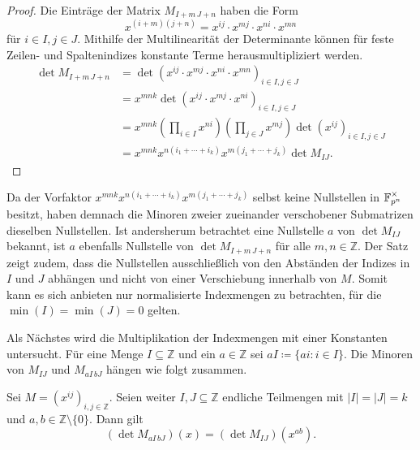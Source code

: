 \begin{proof}
    Die Einträge der Matrix $M_{I+m\,J+n}$ haben die Form 
    \begin{equation*}
        x^{(i+m)(j+n)} = x^{ij} \cdot x^{mj} \cdot x^{ni} \cdot x^{mn} 
    \end{equation*} für $i\in I, j\in J$. Mithilfe der Multilinearität der Determinante können für feste Zeilen- und Spaltenindizes konstante Terme herausmultipliziert werden.
    \begin{align*}
        \det M_{I+m\,J+n}    &= \det \left(x^{ij} \cdot x^{mj} \cdot x^{ni} \cdot x^{mn} \right)_{i\in I,j\in J} \\ 
                            &= x^{mnk} \det \left(x^{ij} \cdot x^{mj} \cdot x^{ni} \right)_{i\in I,j\in J} \\ 
                            &= x^{mnk} \left( \prod_{i \in I} x^{ni} \right) \left( \prod_{j \in J} x^{mj}\right)  \det \left(x^{ij}\right)_{i\in I,j\in J} \\
                            &= x^{mnk} x^{n(i_1 +\cdots +i_k)} x^{m(j_1+\cdots +j_k)}\det M_{IJ}.
    \end{align*}
\end{proof}

Da der Vorfaktor $x^{mnk} x^{n(i_1 +\cdots +i_k)} x^{m(j_1+\cdots +j_k)}$ selbst keine Nullstellen in $\field{p}[n]^\times$ besitzt, haben demnach die Minoren zweier zueinander verschobener Submatrizen dieselben Nullstellen. Ist andersherum betrachtet eine Nullstelle $a$ von $\det M_{IJ}$ bekannt, ist $a$ ebenfalls Nullstelle von $\det M_{I+m\,J+n}$ für alle $m,n \in \mathbb{Z}$. Der Satz zeigt zudem, dass die Nullstellen ausschließlich von den Abständen der Indizes in $I$ und $J$ abhängen und nicht von einer Verschiebung innerhalb von $M$. Somit kann es sich anbieten nur normalisierte Indexmengen zu betrachten, für die $\min(I) = \min(J) = 0$ gelten.

Als Nächstes wird die Multiplikation der Indexmengen mit einer Konstanten untersucht. Für eine Menge $I \subseteq \mathbb{Z}$ und ein $a \in \mathbb{Z}$ sei $aI \coloneqq \{ai:i\in I\}$. Die Minoren von $M_{IJ}$ und $M_{aI\,bJ}$ hängen wie folgt zusammen.

\begin{satz} \label{satz:skalierung}
    Sei $M = \left( x^{ij} \right)_{i,j \in \mathbb{Z}}$. Seien weiter $I,J \subseteq \mathbb{Z}$ endliche Teilmengen mit ${|I|=|J|=k}$ und $a,b \in \mathbb{Z}\setminus\{0\}$. Dann gilt
    \begin{equation*}
        \left( \det{} M_{aI\,bJ} \right) (x) = \left( \det{} M_{IJ} \right) (x^{ab}).
    \end{equation*}
\end{satz}

